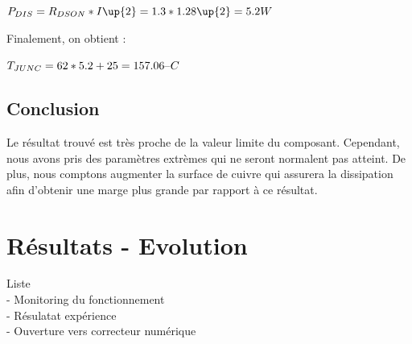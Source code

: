 \documentclass[11pt, french]{article} %
\begin{document}
\noindent
$
P_{DIS} = R_{DSON} * I\up{2} = 1.3 * 1.28\up{2} = 5.2 W
$

\vspace{0.5cm}

\noindent
Finalement, on obtient :

\vspace{0.5cm}

\noindent
$
T_{JUNC} = 62 * 5.2 + 25 = 157.06 \char123C
$

\subsection{Conclusion}

\noindent
Le résultat trouvé est très proche de la valeur limite du composant. Cependant, nous avons pris des paramètres extrèmes qui ne seront normalent pas atteint. De plus, nous comptons augmenter la surface de cuivre qui assurera la dissipation afin d'obtenir une marge plus grande par rapport à ce résultat.

\section{Résultats - Evolution}
Liste
\\- Monitoring du fonctionnement
\\- Résulatat expérience
\\- Ouverture vers correcteur numérique
\end{document}
